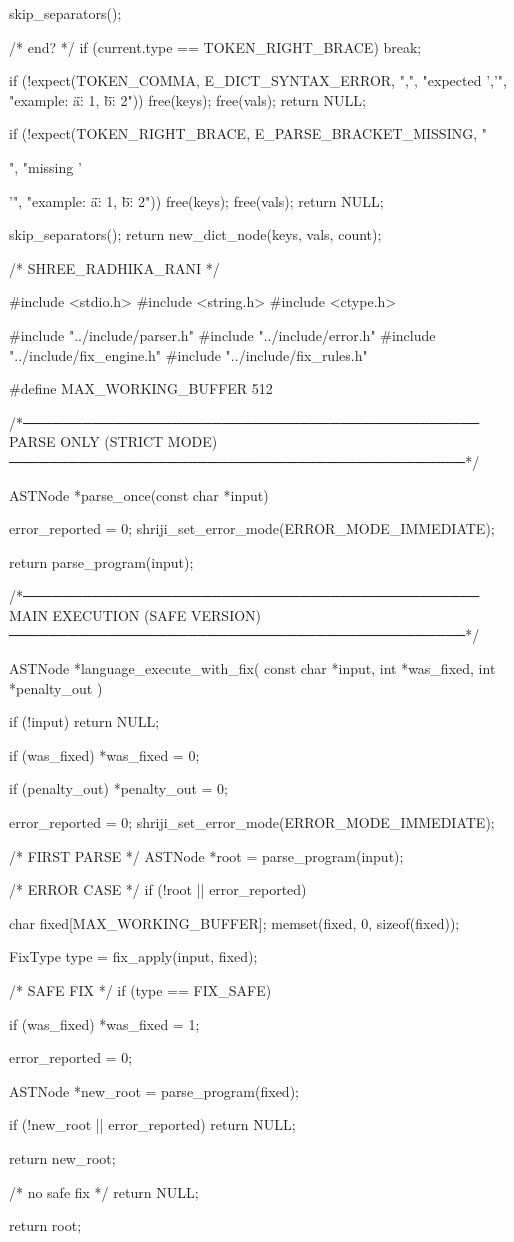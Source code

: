 \documentclass{article}
\begin{document}
{{{{{skip_separators();






/* end? */
if (current.type == TOKEN_RIGHT_BRACE)
    break;

if (!expect(TOKEN_COMMA, E_DICT_SYNTAX_ERROR, ",", "expected ','",
            "example: {\"a\": 1, \"b\": 2}")) {
    free(keys);
    free(vals);
    return NULL;
}

        }
    }

    if (!expect(TOKEN_RIGHT_BRACE, E_PARSE_BRACKET_MISSING, "}", "missing '}'",
                "example: {\"a\": 1, \"b\": 2}")) {
        free(keys);
        free(vals);
        return NULL;
    }

    skip_separators();
    return new_dict_node(keys, vals, count);
}

/* SHREE_RADHIKA_RANI */

#include <stdio.h>
#include <string.h>
#include <ctype.h>

#include "../include/parser.h"
#include "../include/error.h"
#include "../include/fix_engine.h"
#include "../include/fix_rules.h"

#define MAX_WORKING_BUFFER 512


/*──────────────────────────────────────────────
   PARSE ONLY (STRICT MODE)
──────────────────────────────────────────────*/

ASTNode *parse_once(const char *input)
{
    error_reported = 0;
    shriji_set_error_mode(ERROR_MODE_IMMEDIATE);

    return parse_program(input);
}


/*──────────────────────────────────────────────
   MAIN EXECUTION (SAFE VERSION)
──────────────────────────────────────────────*/

ASTNode *language_execute_with_fix(
    const char *input,
    int *was_fixed,
    int *penalty_out
)
{
    if (!input)
        return NULL;

    if (was_fixed)
        *was_fixed = 0;

    if (penalty_out)
        *penalty_out = 0;

    error_reported = 0;
    shriji_set_error_mode(ERROR_MODE_IMMEDIATE);

    /* FIRST PARSE */
    ASTNode *root = parse_program(input);

    /* ERROR CASE */
    if (!root || error_reported)
    {
        char fixed[MAX_WORKING_BUFFER];
        memset(fixed, 0, sizeof(fixed));

        FixType type = fix_apply(input, fixed);

        /* SAFE FIX */
        if (type == FIX_SAFE)
        {
            if (was_fixed)
                *was_fixed = 1;

            error_reported = 0;

            ASTNode *new_root = parse_program(fixed);

            if (!new_root || error_reported)
                return NULL;

            return new_root;
        }

        /* no safe fix */
        return NULL;
    }

    return root;
}
\end{document}
